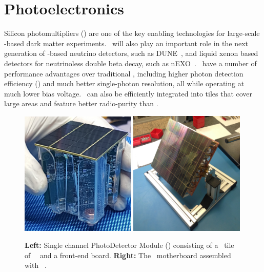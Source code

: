 \section{Photoelectronics}
\label{sec:PE}

Silicon photomultipliers (\SiPMs) are one of the key enabling technologies for large-scale \LAr-based dark matter experiments.  \SiPMs\ will also play an important role in the next generation of \LAr-based neutrino detectors, such as DUNE~\cite{Acciarri:2016wz}, and liquid xenon based detectors for neutrinoless double beta decay, such as nEXO~\cite{Ostrovskiy:2015jl}.  \SiPMs\ have a number of performance advantages over traditional \PMTs, including higher photon detection efficiency (\PDE) and much better single-photon resolution, all while operating at much lower bias voltage. \SiPMs\ can also be efficiently integrated into tiles that cover large areas and feature better radio-purity than \PMTs.

\begin{figure}[!thbp]
\includegraphics[width=0.49\textwidth]{./Figures/PDM-photo.jpg}
\includegraphics[width=0.49\textwidth]{./Figures/MB-photo_cut.jpg}
\caption[The first \DSkPdm\ and first motherboard resulting from the assembly of \DSkPdms]{{\bf Left:} Single channel PhotoDetector Module (\DSkPdm) consisting of   a \DSkTileAreaStd\ tile of  \DSkTileSiPMsCustomNumber\ \SiPMs\ and a front-end board.  {\bf Right:}  The \DSks\ motherboard assembled with \DSkSQBPdmsNumber\ \DSkPdms.}
\label{fig:PDM+MB}
\end{figure}


